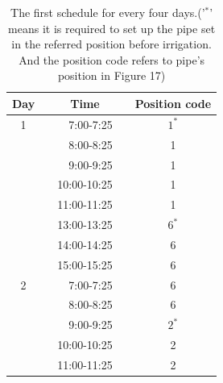 \documentclass[12pt,a4paper,titlepage]{article}
\begin{document}
\begin{table}[!htb]
\centering \caption{The first schedule for every four days.('$^*$'
means it is required to set up the pipe set in the referred
position before irrigation. And the position code refers to pipe's
position in Figure 17)}
\begin{tabular}{lllll}
\hline
\multicolumn{1}{c}{Day} & \multicolumn{1}{c}{} & \multicolumn{1}{c}{Time} & \multicolumn{1}{c}{} & \multicolumn{1}{c}{Position code} \\
\hline
\multicolumn{1}{c}{1} & \multicolumn{1}{c}{} & \multicolumn{1}{r}{7:00-7:25} & \multicolumn{1}{r}{} & \multicolumn{1}{c}{$1^*$} \\
\multicolumn{1}{c}{} & \multicolumn{1}{c}{} & \multicolumn{1}{r}{8:00-8:25} & \multicolumn{1}{r}{} & \multicolumn{1}{c}{1} \\
\multicolumn{1}{c}{} & \multicolumn{1}{c}{} & \multicolumn{1}{r}{9:00-9:25} & \multicolumn{1}{r}{} & \multicolumn{1}{c}{1} \\
\multicolumn{1}{c}{} & \multicolumn{1}{c}{} & \multicolumn{1}{r}{10:00-10:25} & \multicolumn{1}{r}{} & \multicolumn{1}{c}{1} \\
\multicolumn{1}{c}{} & \multicolumn{1}{c}{} & \multicolumn{1}{r}{11:00-11:25} & \multicolumn{1}{r}{} & \multicolumn{1}{c}{1} \\
\multicolumn{1}{c}{} & \multicolumn{1}{c}{} & \multicolumn{1}{r}{13:00-13:25} & \multicolumn{1}{r}{} & \multicolumn{1}{c}{$6^*$} \\
\multicolumn{1}{c}{} & \multicolumn{1}{c}{} & \multicolumn{1}{r}{14:00-14:25} & \multicolumn{1}{r}{} & \multicolumn{1}{c}{6} \\
\multicolumn{1}{c}{} & \multicolumn{1}{c}{} & \multicolumn{1}{r}{15:00-15:25} & \multicolumn{1}{r}{} & \multicolumn{1}{c}{6} \\
\multicolumn{1}{c}{2} & \multicolumn{1}{c}{} & \multicolumn{1}{r}{7:00-7:25} & \multicolumn{1}{r}{} & \multicolumn{1}{c}{6} \\
\multicolumn{1}{c}{} & \multicolumn{1}{c}{} & \multicolumn{1}{r}{8:00-8:25} & \multicolumn{1}{r}{} & \multicolumn{1}{c}{6} \\
\multicolumn{1}{c}{} & \multicolumn{1}{c}{} & \multicolumn{1}{r}{9:00-9:25} & \multicolumn{1}{r}{} & \multicolumn{1}{c}{$2^*$} \\
\multicolumn{1}{c}{} & \multicolumn{1}{c}{} & \multicolumn{1}{r}{10:00-10:25} & \multicolumn{1}{r}{} & \multicolumn{1}{c}{2} \\
\multicolumn{1}{c}{} & \multicolumn{1}{c}{} & \multicolumn{1}{r}{11:00-11:25} & \multicolumn{1}{r}{} & \multicolumn{1}{c}{2} \\

\end{tabular}
\end{table}
\end{document}
